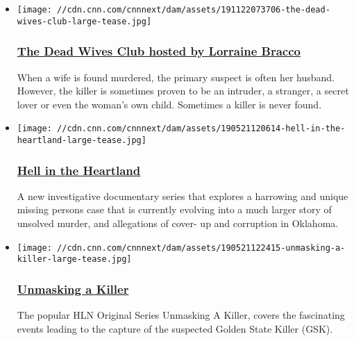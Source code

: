 \begin{itemize}
\item
  \href{https://www.cnncreativemarketing.com/project/dwc/}{}

  \texttt{[image: //cdn.cnn.com/cnnnext/dam/assets/191122073706-the-dead-wives-club-large-tease.jpg]}

  \hypertarget{the-dead-wives-club-hosted-by-lorraine-bracco}{%
  \subsubsection{\texorpdfstring{\href{https://www.cnncreativemarketing.com/project/dwc/}{The
  Dead Wives Club hosted by Lorraine
  Bracco}}{The Dead Wives Club hosted by Lorraine Bracco}}\label{the-dead-wives-club-hosted-by-lorraine-bracco}}

  When a wife is found murdered, the primary suspect is often her
  husband. However, the killer is sometimes proven to be an intruder, a
  stranger, a secret lover or even the woman's own child. Sometimes a
  killer is never found.
\end{itemize}

\begin{itemize}
\item
  \href{https://cnncreativemarketing.com/project/hell-in-the-heartland/}{}

  \texttt{[image: //cdn.cnn.com/cnnnext/dam/assets/190521120614-hell-in-the-heartland-large-tease.jpg]}

  \hypertarget{hell-in-the-heartland}{%
  \subsubsection{\texorpdfstring{\href{https://cnncreativemarketing.com/project/hell-in-the-heartland/}{Hell
  in the
  Heartland}}{Hell in the Heartland}}\label{hell-in-the-heartland}}

  A new investigative documentary series that explores a harrowing and
  unique missing persons case that is currently evolving into a much
  larger story of unsolved murder, and allegations of cover- up and
  corruption in Oklahoma.
\end{itemize}

\begin{itemize}
\item
  \href{https://cnncreativemarketing.com/project/unmasking/}{}

  \texttt{[image: //cdn.cnn.com/cnnnext/dam/assets/190521122415-unmasking-a-killer-large-tease.jpg]}

  \hypertarget{unmasking-a-killer}{%
  \subsubsection{\texorpdfstring{\href{https://cnncreativemarketing.com/project/unmasking/}{Unmasking
  a Killer}}{Unmasking a Killer}}\label{unmasking-a-killer}}

  The popular HLN Original Series Unmasking A Killer, covers the
  fascinating events leading to the capture of the suspected Golden
  State Killer (GSK).
\end{itemize}


